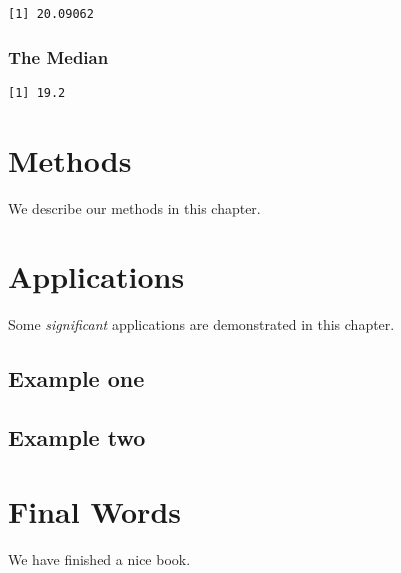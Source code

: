 \documentclass[]{book}
\newenvironment{Shaded}{\begin{snugshade}}{\end{snugshade}}
\newcommand{\KeywordTok}[1]{\textcolor[rgb]{0.13,0.29,0.53}{\textbf{#1}}}
\newcommand{\OperatorTok}[1]{\textcolor[rgb]{0.81,0.36,0.00}{\textbf{#1}}}
\newcommand{\NormalTok}[1]{#1}
\theoremstyle{definition}
\theoremstyle{definition}
\theoremstyle{definition}
\theoremstyle{remark}
\begin{document}
\begin{verbatim}
[1] 20.09062
\end{verbatim}

\subsection{The Median}\label{the-median}

\begin{Shaded}
\end{Shaded}

\begin{verbatim}
[1] 19.2
\end{verbatim}

\chapter{Methods}\label{methods}

We describe our methods in this chapter.

\chapter{Applications}\label{applications}

Some \emph{significant} applications are demonstrated in this chapter.

\section{Example one}\label{example-one}

\section{Example two}\label{example-two}

\chapter{Final Words}\label{final-words}

We have finished a nice book.


\end{document}
